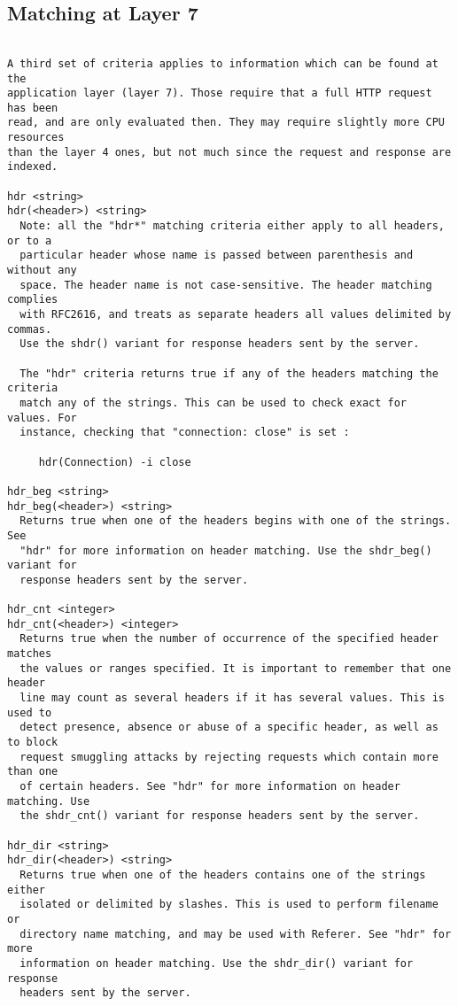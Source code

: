 
\subsection{Matching at Layer 7}

\begin{verbatim}

A third set of criteria applies to information which can be found at the
application layer (layer 7). Those require that a full HTTP request has been
read, and are only evaluated then. They may require slightly more CPU resources
than the layer 4 ones, but not much since the request and response are indexed.

hdr <string>
hdr(<header>) <string>
  Note: all the "hdr*" matching criteria either apply to all headers, or to a
  particular header whose name is passed between parenthesis and without any
  space. The header name is not case-sensitive. The header matching complies
  with RFC2616, and treats as separate headers all values delimited by commas.
  Use the shdr() variant for response headers sent by the server.

  The "hdr" criteria returns true if any of the headers matching the criteria
  match any of the strings. This can be used to check exact for values. For
  instance, checking that "connection: close" is set :

     hdr(Connection) -i close

hdr_beg <string>
hdr_beg(<header>) <string>
  Returns true when one of the headers begins with one of the strings. See
  "hdr" for more information on header matching. Use the shdr_beg() variant for
  response headers sent by the server.

hdr_cnt <integer>
hdr_cnt(<header>) <integer>
  Returns true when the number of occurrence of the specified header matches
  the values or ranges specified. It is important to remember that one header
  line may count as several headers if it has several values. This is used to
  detect presence, absence or abuse of a specific header, as well as to block
  request smuggling attacks by rejecting requests which contain more than one
  of certain headers. See "hdr" for more information on header matching. Use
  the shdr_cnt() variant for response headers sent by the server.

hdr_dir <string>
hdr_dir(<header>) <string>
  Returns true when one of the headers contains one of the strings either
  isolated or delimited by slashes. This is used to perform filename or
  directory name matching, and may be used with Referer. See "hdr" for more
  information on header matching. Use the shdr_dir() variant for response
  headers sent by the server.


\end{verbatim}
